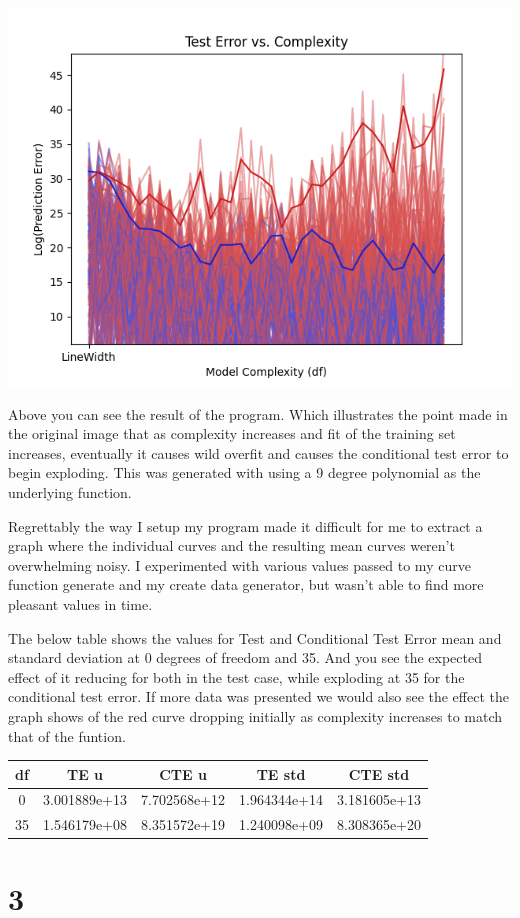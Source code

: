 \documentclass[11pt]{article} %
\newcommand{\problem}[1]{\section{#1}}		%
\begin{document}
\begin{itemize}
    \includegraphics[scale=0.75]{slide_pic_recreation.png}

    Above you can see the result of the program. Which illustrates the point made in the original image that as complexity increases and fit of the training set increases, eventually it causes wild overfit and causes the conditional test error to begin exploding. This was generated with using a 9 degree polynomial as the underlying function.

    Regrettably the way I setup my program made it difficult for me to extract a graph where the individual curves and the resulting mean curves weren't overwhelming noisy. I experimented with various values passed to my curve function generate and my create data generator, but wasn't able to find more pleasant values in time.

    The below table shows the values for Test and Conditional Test Error mean and standard deviation at 0 degrees of freedom and 35. And you see the expected effect of it reducing for both  in the test case, while exploding at 35 for the conditional test error. If more data was presented we would also see the effect the graph shows of the red curve dropping initially as complexity increases to match that of the funtion.

\begin{center}
\begin{tabular}{||c c c c c||}
 \hline
 df & TE u & CTE u & TE std & CTE std \\ [0.5ex]
 \hline\hline
 0 & 3.001889e+13  & 7.702568e+12 & 1.964344e+14 & 3.181605e+13 \\
 \hline
 35 & 1.546179e+08 & 8.351572e+19 & 1.240098e+09 & 8.308365e+20 \\
 \hline
\end{tabular}
\end{center}
\newpage
\problem{3}
\newline
{}\newline


\end{itemize}
\end{document}
